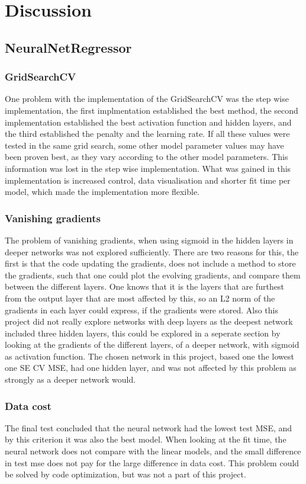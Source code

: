 \section{Discussion}
\label{sec:discussion}
\subsection{NeuralNetRegressor}
\subsubsection{GridSearchCV}
One problem with the implementation of the GridSearchCV was the step wise
implementation, the first implmentation established 
the best method, the second implementation established the 
best activation function and hidden layers, and the third
established the penalty and the learning rate. If all
these values were tested in the same grid search, 
some other model parameter values may have been proven best,
as they vary according to the other model parameters. This
information was lost in the step wise implementation. What
was gained in this implementation is increased control,
data visualisation and shorter fit time per model, which made the implementation
more flexible. 
\subsubsection{Vanishing gradients}
The problem of vanishing gradients, when using sigmoid
in the hidden layers in deeper networks was not explored
sufficiently. There are two reasons for this, the first
is that the code updating the gradients, does not
include a method to store the gradients, such that one
could plot the evolving gradients, and compare them between the different layers.
One knows that it is the layers that are furthest from the 
output layer that are most affected by this, so an L2 norm
of the gradients in each layer could express, if the 
gradients were stored. \cite{VanishingGradient2024}
Also this project did not really explore networks with deep layers
as the deepest network included three hidden layers, this
could be explored in a seperate section by looking at the
gradients of the different layers, of a deeper network,
with sigmoid as activation function. The chosen network
in this project, based one the lowest one SE CV MSE, had one hidden layer, and was not affected
by this problem as strongly as a deeper network would. 
\subsubsection{Data cost}
The final test concluded that the neural network had the 
lowest test MSE, and by this criterion it was also the best
model. When looking at the fit time, the neural network does
not compare with the linear models, and the small difference
in test mse does not pay for the large difference in data cost.
This problem could be solved by code optimization, but was
not a part of this project. 

